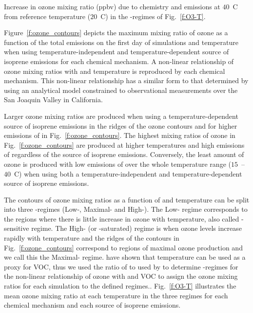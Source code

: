 \begin{table}%
    \centering%
    \caption{Increase in ozone mixing ratio (ppbv) due to chemistry and emissions at $40$~\degree C from reference temperature ($20$~\degree C) in the -regimes of Fig.~\ref{f:O3-T}.}%
    \label{t:differences}%
\end{table}

Figure~\ref{f:ozone_contours} depicts the maximum mixing ratio of ozone as a function of the total  emissions on the first day of simulations and temperature when using temperature-independent and temperature-dependent source of isoprene emissions for each chemical mechanism.
A non-linear relationship of ozone mixing ratios with  and temperature is reproduced by each chemical mechanism.
This non-linear relationship has a similar form to that determined by \citet{Pusede:2014} using an analytical model constrained to observational measurements over the San Joaquin Valley in California.

Larger ozone mixing ratios are produced when using a temperature-dependent source of isoprene emissions in the ridges of the ozone contours and for higher emissions of  in Fig.~\ref{f:ozone_contours}.
The highest mixing ratios of ozone in Fig.~\ref{f:ozone_contours} are produced at higher temperatures and high emissions of  regardless of the source of isoprene emissions.
Conversely, the least amount of ozone is produced with low emissions of  over the whole temperature range ($15$~--~$40$~\degree C) when using both a temperature-independent and temperature-dependent source of isoprene emissions.

The contours of ozone mixing ratios as a function of  and temperature can be split into three -regimes (Low-, Maximal- and High-).
The Low- regime corresponds to the regions where there is little increase in ozone with temperature, also called -sensitive regime.
The High- (or -saturated) regime is when ozone levels increase rapidly with temperature and the ridges of the contours in Fig.~\ref{f:ozone_contours} correspond to regions of maximal ozone production and we call this the Maximal- regime.
\citet{Pusede:2014} have shown that temperature can be used as a proxy for VOC, thus we used the ratio of  to  used by \citet{Sillman:1995} to determine -regimes for the non-linear relationship of ozone with  and VOC to assign the ozone mixing ratios for each simulation to the defined  regimes..
Fig.~\ref{f:O3-T} illustrates the mean ozone mixing ratio at each temperature in the three  regimes for each chemical mechanism and each source of isoprene emissions.

